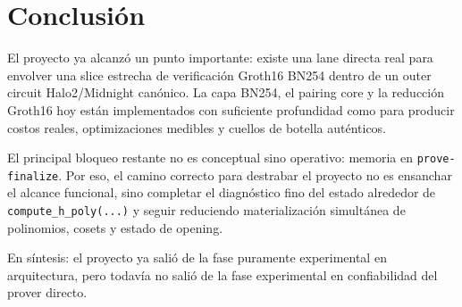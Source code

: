 \documentclass[11pt,a4paper]{article}
\begin{document}
\section{Conclusi\'on}

El proyecto ya alcanz\'o un punto importante: existe una lane directa real para envolver una slice
estrecha de verificaci\'on Groth16 BN254 dentro de un outer circuit Halo2/Midnight can\'onico.
La capa BN254, el pairing core y la reducci\'on Groth16 hoy est\'an implementados con suficiente
profundidad como para producir costos reales, optimizaciones medibles y cuellos de botella
aut\'enticos.

El principal bloqueo restante no es conceptual sino operativo: memoria en \texttt{prove-finalize}.
Por eso, el camino correcto para destrabar el proyecto no es ensanchar el alcance funcional,
sino completar el diagn\'ostico fino del estado alrededor de \texttt{compute\_h\_poly(...)} y seguir
reduciendo materializaci\'on simult\'anea de polinomios, cosets y estado de opening.

En s\'intesis: el proyecto ya sali\'o de la fase puramente experimental en arquitectura, pero todav\'ia
no sali\'o de la fase experimental en confiabilidad del prover directo.
\end{document}
